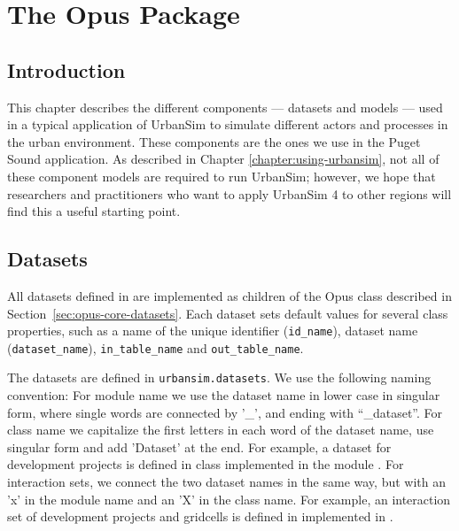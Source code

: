 

\chapter{The  Opus Package}

\section{Introduction}

This chapter describes the different components --- datasets \datasetindex and models \modelsindex ---
used in a typical application of UrbanSim to simulate different actors and
processes in the urban environment.  These components are the ones we
use in the Puget Sound application.  As described in Chapter
\ref{chapter:using-urbansim}, not all of these component models are required
to run UrbanSim; however, we hope that researchers and practitioners who want
to apply UrbanSim 4 to other regions will find this a useful starting point.

\section{Datasets}
\label{sec:urbansim-datasets}
\datasetindex
%
All datasets \datasetindex defined in  are implemented as children of the
Opus  class  \datasetindex described in
Section~\ref{sec:opus-core-datasets}. Each dataset \datasetindex sets default values for several
class properties, such as a name of the unique identifier (\verb|id_name|),
dataset \datasetindex name (\verb|dataset_name|), \datasetindex \verb|in_table_name| and
\verb|out_table_name|. 

The  datasets \datasetindex are defined in \verb|urbansim.datasets|. \datasetindex
We use the following naming convention: For module name we use the dataset 
name in lower case in singular form, where single words are connected by
'_', and ending with ``_dataset''.
For class name we capitalize the first letters in each word of the dataset \datasetindex
name, use singular form and add 'Dataset' at the end. For example, a dataset \datasetindex for
development projects is defined in class 
implemented in the module . For interaction
sets, we connect the two dataset \datasetindex names in the same way, but with 
an 'x' in the module name and an 'X' in the class name. For example, an
interaction set of development projects and gridcells is defined in
 implemented in
.

